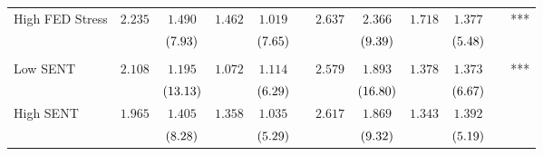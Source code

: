 \begin{tabular}{@{}lccccccccccc@{}}
High FED Stress&$2.235$&$1.490$&$1.462$&$1.019$&&$2.637$&$2.366$&$1.718$&$1.377$&&***\\%
&&$\footnotesize{(7.93)}$&&$\footnotesize{(7.65)}$&&&$\footnotesize{(9.39)}$&&$\footnotesize{(5.48)}$&&\\%
\midrule%
&&&&&&&&&&&\\%
Low SENT&$2.108$&$1.195$&$1.072$&$1.114$&&$2.579$&$1.893$&$1.378$&$1.373$&&***\\%
&&$\footnotesize{(13.13)}$&&$\footnotesize{(6.29)}$&&&$\footnotesize{(16.80)}$&&$\footnotesize{(6.67)}$&&\\%
High SENT&$1.965$&$1.405$&$1.358$&$1.035$&&$2.617$&$1.869$&$1.343$&$1.392$&&\\%
&&$\footnotesize{(8.28)}$&&$\footnotesize{(5.29)}$&&&$\footnotesize{(9.32)}$&&$\footnotesize{(5.19)}$&&\\\bottomrule%
%
\end{tabular}